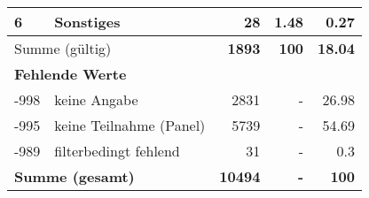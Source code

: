 \begin{longtable}{lXrrr}
     6 &
     \multicolumn{1}{X}{ Sonstiges   } &


       \num{28} &
       \num[round-mode=places,round-precision=2]{1,48} &
         \num[round-mode=places,round-precision=2]{0,27} \\
     \midrule
     \multicolumn{2}{l}{Summe (gültig)} &
       \textbf{\num{1893}} &
     \textbf{100} &
       \textbf{\num[round-mode=places,round-precision=2]{18,04}} \\
     \multicolumn{5}{l}{\textbf{Fehlende Werte}}\\
       -998 &
       keine Angabe &
         \num{2831} &
        - &
         \num[round-mode=places,round-precision=2]{26,98} \\
       -995 &
       keine Teilnahme (Panel) &
         \num{5739} &
        - &
         \num[round-mode=places,round-precision=2]{54,69} \\
       -989 &
       filterbedingt fehlend &
         \num{31} &
        - &
         \num[round-mode=places,round-precision=2]{0,3} \\
     \midrule
     \multicolumn{2}{l}{\textbf{Summe (gesamt)}} &
          \textbf{\num{10494}} &
        \textbf{-} &
        \textbf{100} \\
     \bottomrule
     \end{longtable}
     
